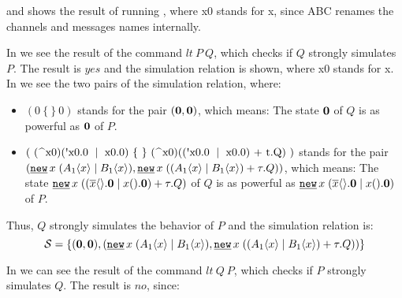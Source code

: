  and  shows the result of running , where x0 stands for x, since ABC renames the channels and messages names internally.

In  we see the result of the command $lt\ P\ Q$, which checks if $Q$ strongly simulates $P$. The result is $yes$ and the simulation relation is shown, where x0 stands for x. In  we see the two pairs of the simulation relation, where:
\begin{itemize}
\item $(0\ \{\ \}\ 0)$ stands for the pair $(\mathbf{0},\mathbf{0})$, which means: The state $\mathbf{0}$ of $Q$ is as powerful as  $\mathbf{0}$ of $P$.
\item $(\ (\ \widehat{}\ \text{x0})(\text{\textquotesingle x0.0}\ \mid\ \text{x0.0})\ \{\ \}\ (\ \widehat{}\ \text{x0})((\text{\textquotesingle x0.0}\ \mid\ \text{x0.0}) \text{ + t.Q} )\ )$ stands for the pair $(\procres{x}{(\procpar{\proccall{A_1}{x}}{\proccall{B_1}{x}})},\procres{x}{(\procchoice{(\procpar{\proccall{A_1}{x}}{\proccall{B_1}{x}})}{\tau.Q})})$, which means: The state $\procres{x}{(\procchoice{(\procpar{\out{x}{}.\proczero}{\inp{x}{}.\proczero})}{\tau.Q})}$ of $Q$ is as powerful as  $\procres{x}{(\procpar{\out{x}{}.\proczero}{\inp{x}{}.\proczero})}$ of $P$.

\end{itemize}

Thus, $Q$ strongly simulates the behavior of $P$ and the simulation relation is: \[\mathcal{S} = \set{(\proczero,\proczero),(\procres{x}{(\procpar{\proccall{A_1}{x}}{\proccall{B_1}{x}})},\procres{x}{(\procchoice{(\procpar{\proccall{A_1}{x}}{\proccall{B_1}{x}})}{\tau.Q})})}\]

In  we can see the result of the command $lt\ Q\ P$, which checks if $P$ strongly simulates $Q$. The result is $no$, since:

